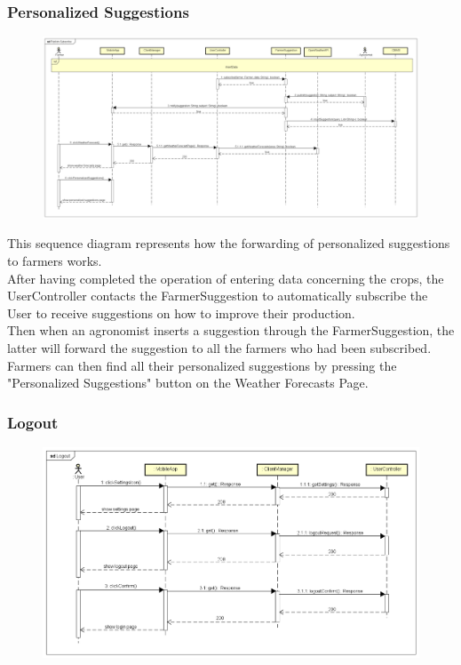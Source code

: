 \newpage
\subsubsection{Personalized Suggestions}

\begin{figure}[H]
    \begin{center}
        \includegraphics[width=\textwidth]{Images/SequenceDiagrams/Publish-SubscribeDD.png}
    \end{center}
\end{figure}

This sequence diagram represents how the forwarding of personalized suggestions to farmers works.\\
After having completed the operation of entering data concerning the crops, the UserController contacts 
the FarmerSuggestion to automatically subscribe the User to receive suggestions on how to improve their production.\\
Then when an agronomist inserts a suggestion through the FarmerSuggestion, the latter will 
forward the suggestion to all the farmers who had been subscribed.\\
Farmers can then find all their personalized suggestions by pressing the "Personalized Suggestions" button on the Weather Forecasts Page.


\newpage
\subsubsection{Logout}

\begin{figure}[H]
    \begin{center}
        \includegraphics[width=\textwidth]{Images/SequenceDiagrams/LogoutDD.png}
    \end{center}
\end{figure}

